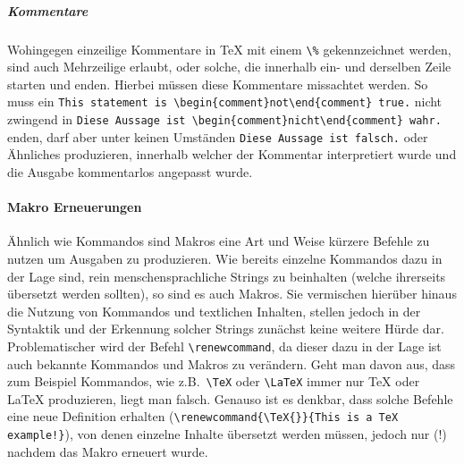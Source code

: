 \subparagraph*{Kommentare}\par
Wohingegen einzeilige Kommentare in \TeX{} mit einem \verb"\%" gekennzeichnet werden, sind auch Mehrzeilige erlaubt, oder solche, die innerhalb ein- und derselben Zeile starten und enden. Hierbei müssen diese Kommentare missachtet werden. So muss ein \verb|This statement is \begin{comment}not\end{comment} true.| nicht zwingend in \verb|Diese Aussage ist \begin{comment}nicht\end{comment} wahr.| enden, darf aber unter keinen Umständen \verb|Diese Aussage ist falsch.| oder Ähnliches produzieren, innerhalb welcher der Kommentar interpretiert wurde und die Ausgabe kommentarlos angepasst wurde.


\paragraph*{Makro Erneuerungen}\par
Ähnlich wie Kommandos sind Makros eine Art und Weise kürzere Befehle zu nutzen um Ausgaben zu produzieren.%
Wie bereits einzelne Kommandos dazu in der Lage sind, rein menschensprachliche Strings zu beinhalten (welche ihrerseits übersetzt werden sollten), so sind es auch Makros. Sie vermischen hierüber hinaus die Nutzung von Kommandos und textlichen Inhalten, stellen jedoch in der Syntaktik und der Erkennung solcher Strings zunächst keine weitere Hürde dar. Problematischer wird der Befehl \verb|\renewcommand|, da dieser dazu in der Lage ist auch bekannte Kommandos und Makros zu verändern. Geht man davon aus, dass zum Beispiel Kommandos, wie z.B.\ \verb|\TeX| oder \verb|\LaTeX| immer nur \TeX{} oder \LaTeX{} produzieren, liegt man falsch. Genauso ist es denkbar, dass solche Befehle eine neue Definition erhalten (\verb|\renewcommand{\TeX{}}{This is a TeX example!}|), von denen einzelne Inhalte übersetzt werden müssen, jedoch nur (!) nachdem das Makro erneuert wurde.

\begin{comment}
    This is a \TeX{} example!
    \renewcommand{\TeX{}}{This is a TeX example!}
    \TeX{}
\end{comment}
\begin{comment}
    Muss zu:
        Das ist ein \TeX{} Beispiel!
        \renewcommand{\TeX{}}{Das ist ein TeX Beispiel!}
        \TeX{}
    werden und dabei:
        Das ist ein \TeX{} Beispiel!
        Das ist ein TeX Beispiel!
    produzieren und nicht:
        Das ist ein Das ist ein TeX Beispiel! Beispiel!
        Das ist ein TeX Beispiel!
\end{comment}


